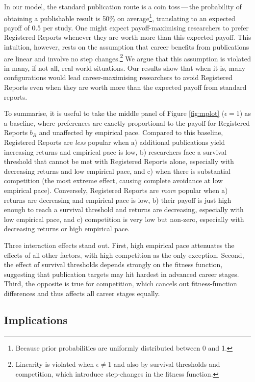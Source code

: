 \documentclass[
  british,
  a4paper,
  ,man,floatsintext]{apa6}
\begin{document}
In our model, the standard publication route is a coin toss\(\,\)---\(\,\)the probability of obtaining a publishable result is 50\% on average\footnote{Because prior probabilities are uniformly distributed between 0 and 1.}, translating to an expected payoff of 0.5 per study.
One might expect payoff-maximising researchers to prefer Registered Reports whenever they are worth more than this expected payoff.
This intuition, however, rests on the assumption that career benefits from publications are linear and involve no step changes.\footnote{Linearity is violated when \(\epsilon \neq 1\) and also by survival thresholds and competition, which introduce step-changes in the fitness function.}
We argue that this assumption is violated in many, if not all, real-world situations.
Our results show that when it is, many configurations would lead career-maximising researchers to avoid Registered Reports even when they are worth more than the expected payoff from standard reports.

To summarise, it is useful to take the middle panel of Figure \ref{fig:mplot} (\(\epsilon = 1\)) as a baseline, where preferences are exactly proportional to the payoff for Registered Reports \(b_{R}\) and unaffected by empirical pace.
Compared to this baseline, Registered Reports are \emph{less} popular when a) additional publications yield increasing returns and empirical pace is low, b) researchers face a survival threshold that cannot be met with Registered Reports alone, especially with decreasing returns and low empirical pace, and c) when there is substantial competition (the most extreme effect, causing complete avoidance at low empirical pace).
Conversely, Registered Reports are \emph{more} popular when a) returns are decreasing and empirical pace is low, b) their payoff is just high enough to reach a survival threshold and returns are decreasing, especially with low empirical pace, and c) competition is very low but non-zero, especially with decreasing returns or high empirical pace.

Three interaction effects stand out.
First, high empirical pace attenuates the effects of all other factors, with high competition as the only exception.
Second, the effect of survival thresholds depends strongly on the fitness function, suggesting that publication targets may hit hardest in advanced career stages.
Third, the opposite is true for competition, which cancels out fitness-function differences and thus affects all career stages equally.

\subsection{Implications}\label{implications}
\end{document}
